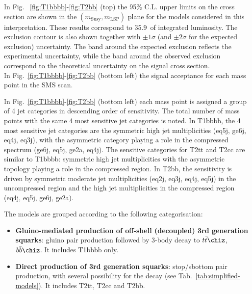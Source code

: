 In Fig. ~\ref{fig:T1bbbb}-\ref{fig:T2bb} (top) the 95\% C.L. upper limits on the
cross section are shown in the $(m_{\mathrm{Susy}},m_{\mathrm{LSP}})$ plane for
the models considered in this interpretation. These results correspond to
35.9~\ifb of integrated luminosity. The exclusion contour is also shown together
with $\pm1\sigma$ (and $\pm2\sigma$ for the expected exclusion) uncertainty.
The band around the expected exclusion reflects the experimental uncertainty,
while the band around the observed exclusion correspond to the theoretical
uncertainty on the signal cross section.\\

In Fig.~\ref{fig:T1bbbb}-\ref{fig:T2bb} (bottom left) the signal acceptance
for each mass point in the SMS scan.

In Fig.~\ref{fig:T1bbbb}-\ref{fig:T2bb} (bottom left) each mass point is
assigned a group of 4 jet categories in descending order of sensitivity. The
total number of mass points with the same 4 most sensitive jet categories is
noted. In T1bbbb, the 4 most sensitive jet categories are the symmetric high jet
multiplicities (eq5j, ge6j, eq4j, eq3j), with the asymmetric category playing
a role in the compressed spectrum (ge6j, eq5j, ge2a, eq4j). The sensitive
categories for T2tt and T2cc are similar to T1bbbb: symmetric high jet
multiplicities with the asymmetric topology playing a role in the compressed
region. In T2bb, the sensitivity is driven by symmetric moderate jet
multiplicities (eq2j, eq3j, eq4j, eq5j) in the uncompressed region and the high
jet multiplicities in the compressed region (eq4j, eq5j, ge6j, ge2a).

The models are grouped according to the following categorisation:
\begin{itemize}
    \item \textbf{Gluino-mediated production of off-shell (decoupled) 3rd generation squarks}:
        gluino pair production followed by 3-body decay to $t\bar{t}\chiz$,$b\bar{b}\chiz$.
        It includes T1bbbb only.
    \item \textbf{Direct production of 3rd generation squarks}: stop/sbottom
        pair production, with several possibility for the decay
        (see Tab.~\ref{tab:simplified-models}). It includes T2tt, T2cc and T2bb.
\end{itemize}


